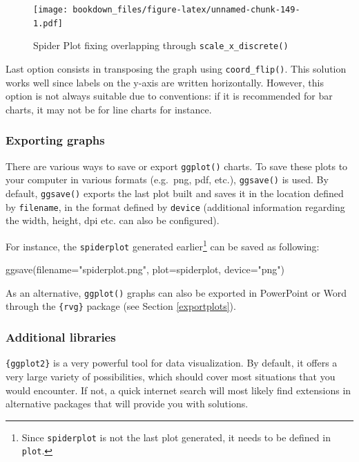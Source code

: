 \documentclass[
]{krantz}
\makeatletter
\newenvironment{Shaded}{\begin{snugshade}}{\end{snugshade}}
\newcommand{\AttributeTok}[1]{\textcolor[rgb]{0.61,0.61,0.61}{#1}}
\newcommand{\FunctionTok}[1]{\textcolor[rgb]{0,0,0}{#1}}
\newcommand{\NormalTok}[1]{#1}
\newcommand{\StringTok}[1]{\textcolor[rgb]{0.5,0.5,0.5}{#1}}
\newenvironment{kframe}{%
\medskip{}
\setlength{\fboxsep}{.8em}
 \def\at@end@of@kframe{}%
 \ifinner\ifhmode%
  \def\at@end@of@kframe{\end{minipage}}%
  \begin{minipage}{\columnwidth}%
 \fi\fi%
 \def\FrameCommand##1{\hskip\@totalleftmargin \hskip-\fboxsep
 \colorbox{shadecolor}{##1}\hskip-\fboxsep
     \hskip-\linewidth \hskip-\@totalleftmargin \hskip\columnwidth}%
 \MakeFramed {\advance\hsize-\width
   \@totalleftmargin\z@ \linewidth\hsize
   \@setminipage}}%
 {\par\unskip\endMakeFramed%
 \at@end@of@kframe}
\renewenvironment{Shaded}{\begin{kframe}}{\end{kframe}}
\makeatother
\begin{document}
\begin{figure}
\centering
\texttt{[image: bookdown\_files/figure-latex/unnamed-chunk-149-1.pdf]}
\caption{\label{fig:unnamed-chunk-149}Spider Plot fixing overlapping through \texttt{scale\_x\_discrete()}}
\end{figure}

Last option consists in transposing the graph using \texttt{coord\_flip()}. This solution works well since labels on the y-axis are written horizontally. However, this option is not always suitable due to conventions: if it is recommended for bar charts, it may not be for line charts for instance.

\hypertarget{export}{%
\subsubsection*{Exporting graphs}\label{export}}


There are various ways to save or export \texttt{ggplot()} charts. To save these plots to your computer in various formats (e.g.~png, pdf, etc.), \texttt{ggsave()} is used. By default, \texttt{ggsave()} exports the last plot built and saves it in the location defined by \texttt{filename}, in the format defined by \texttt{device} (additional information regarding the width, height, dpi etc. can also be configured).

For instance, the \texttt{spiderplot} generated earlier\footnote{Since \texttt{spiderplot} is not the last plot generated, it needs to be defined in \texttt{plot}.} can be saved as following:

\begin{Shaded}
\begin{Highlighting}[]
\FunctionTok{ggsave}\NormalTok{(}\AttributeTok{filename=}\StringTok{"spiderplot.png"}\NormalTok{, }\AttributeTok{plot=}\NormalTok{spiderplot, }\AttributeTok{device=}\StringTok{"png"}\NormalTok{)}
\end{Highlighting}
\end{Shaded}

As an alternative, \texttt{ggplot()} graphs can also be exported in PowerPoint or Word through the \texttt{\{rvg\}} package (see Section \ref{exportplots}).

\hypertarget{additional}{%
\subsubsection*{Additional libraries}\label{additional}}


\texttt{\{ggplot2\}} is a very powerful tool for data visualization. By default, it offers a very large variety of possibilities, which should cover most situations that you would encounter. If not, a quick internet search will most likely find extensions in alternative packages that will provide you with solutions.
\end{document}
